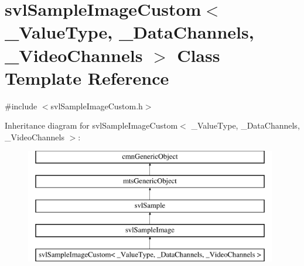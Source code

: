 \hypertarget{classsvl_sample_image_custom}{\section{svl\-Sample\-Image\-Custom$<$ \-\_\-\-Value\-Type, \-\_\-\-Data\-Channels, \-\_\-\-Video\-Channels $>$ Class Template Reference}
\label{classsvl_sample_image_custom}
}


{\ttfamily \#include $<$svl\-Sample\-Image\-Custom.\-h$>$}

Inheritance diagram for svl\-Sample\-Image\-Custom$<$ \-\_\-\-Value\-Type, \-\_\-\-Data\-Channels, \-\_\-\-Video\-Channels $>$\-:\begin{figure}[H]
\begin{center}
\leavevmode
\includegraphics[height=5.000000cm]{d9/da7/classsvl_sample_image_custom}
\end{center}
\end{figure}
